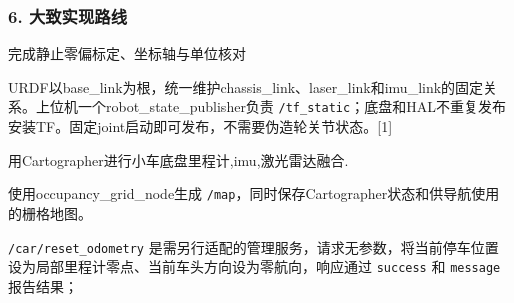 \documentclass[UTF8,fontset=fandol,11pt,a4paper]{ctexart}
\begin{document}
\subsubsection*{6. 大致实现路线}
完成静止零偏标定、坐标轴与单位核对

URDF以base\_link为根，统一维护chassis\_link、laser\_link和imu\_link的固定关系。上位机一个robot\_state\_publisher负责 \nolinkurl{/tf_static}；底盘和HAL不重复发布安装TF。固定joint启动即可发布，不需要伪造轮关节状态。[1]

用Cartographer进行小车底盘里程计,imu,激光雷达融合.

使用occupancy\_grid\_node生成 \nolinkurl{/map}，同时保存Cartographer状态和供导航使用的栅格地图。

\nolinkurl{/car/reset_odometry} 是需另行适配的管理服务，请求无参数，将当前停车位置设为局部里程计零点、当前车头方向设为零航向，响应通过 \nolinkurl{success} 和 \nolinkurl{message} 报告结果；

\end{document}
